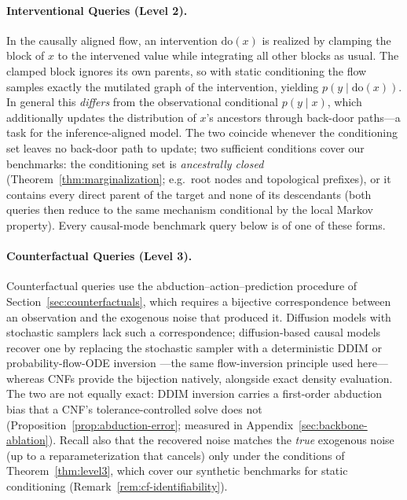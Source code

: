 \paragraph{Interventional Queries (Level 2).} In the causally aligned flow, an intervention $\mathrm{do}(x)$ is realized by clamping the block of $x$ to the intervened value while integrating all other blocks as usual. The clamped block ignores its own parents, so with static conditioning the flow samples exactly the mutilated graph of the intervention, yielding $p(y \mid \mathrm{do}(x))$. In general this \emph{differs} from the observational conditional $p(y \mid x)$, which additionally updates the distribution of $x$'s ancestors through back-door paths---a task for the inference-aligned model. The two coincide whenever the conditioning set leaves no back-door path to update; two sufficient conditions cover our benchmarks: the conditioning set is \emph{ancestrally closed} (Theorem~\ref{thm:marginalization}; e.g.\ root nodes and topological prefixes), or it contains every direct parent of the target and none of its descendants (both queries then reduce to the same mechanism conditional by the local Markov property). Every causal-mode benchmark query below is of one of these forms.

\paragraph{Counterfactual Queries (Level 3).} Counterfactual queries use the abduction--action--prediction procedure of Section~\ref{sec:counterfactuals}, which requires a bijective correspondence between an observation and the exogenous noise that produced it. Diffusion models with stochastic samplers lack such a correspondence; diffusion-based causal models recover one by replacing the stochastic sampler with a deterministic DDIM or probability-flow-ODE inversion \citep{sanchez2022diffusion, chao2023interventional}---the same flow-inversion principle used here---whereas CNFs provide the bijection natively, alongside exact density evaluation. The two are not equally exact: DDIM inversion carries a first-order abduction bias that a CNF's tolerance-controlled solve does not (Proposition~\ref{prop:abduction-error}; measured in Appendix~\ref{sec:backbone-ablation}). Recall also that the recovered noise matches the \emph{true} exogenous noise (up to a reparameterization that cancels) only under the conditions of Theorem~\ref{thm:level3}, which cover our synthetic benchmarks for static conditioning (Remark~\ref{rem:cf-identifiability}).

